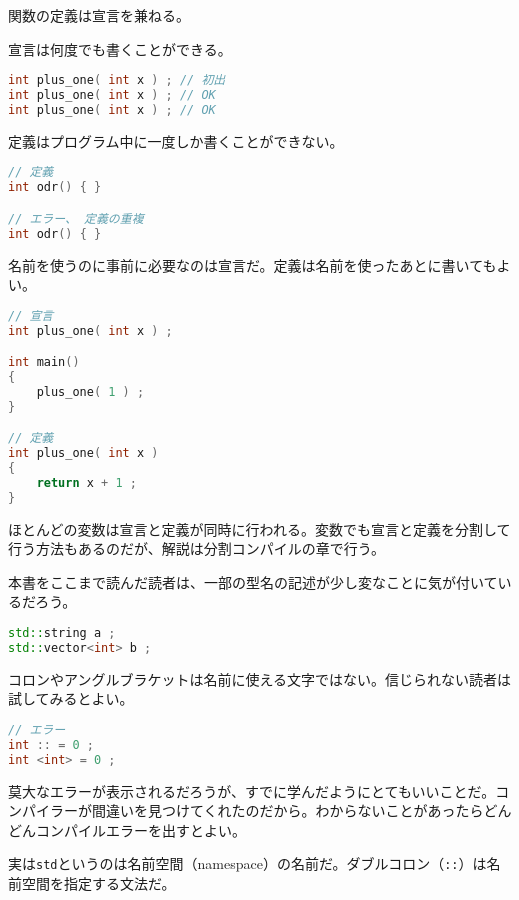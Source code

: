 関数の定義は宣言を兼ねる。

宣言は何度でも書くことができる。

\begin{lstlisting}[language={C++}]
int plus_one( int x ) ; // 初出
int plus_one( int x ) ; // OK
int plus_one( int x ) ; // OK
\end{lstlisting}

定義はプログラム中に一度しか書くことができない。

\ifTombow\pagebreak\fi
\begin{lstlisting}[language={C++}]
// 定義
int odr() { }

// エラー、 定義の重複
int odr() { }
\end{lstlisting}

名前を使うのに事前に必要なのは宣言だ。定義は名前を使ったあとに書いてもよい。

\begin{lstlisting}[language={C++}]
// 宣言
int plus_one( int x ) ;

int main()
{
    plus_one( 1 ) ;
}

// 定義
int plus_one( int x )
{
    return x + 1 ;
}
\end{lstlisting}

ほとんどの変数は宣言と定義が同時に行われる。変数でも宣言と定義を分割して行う方法もあるのだが、解説は分割コンパイルの章で行う。


本書をここまで読んだ読者は、一部の型名の記述が少し変なことに気が付いているだろう。

\begin{lstlisting}[language={C++}]
std::string a ;
std::vector<int> b ;
\end{lstlisting}

コロンやアングルブラケットは名前に使える文字ではない。信じられない読者は試してみるとよい。

\begin{lstlisting}[language={C++}]
// エラー
int :: = 0 ;
int <int> = 0 ;
\end{lstlisting}

莫大なエラーが表示されるだろうが、すでに学んだようにとてもいいことだ。コンパイラーが間違いを見つけてくれたのだから。わからないことがあったらどんどんコンパイルエラーを出すとよい。

実は\texttt{std}というのは名前空間（namespace）の名前だ。ダブルコロン（\texttt{::}）は名前空間を指定する文法だ。

